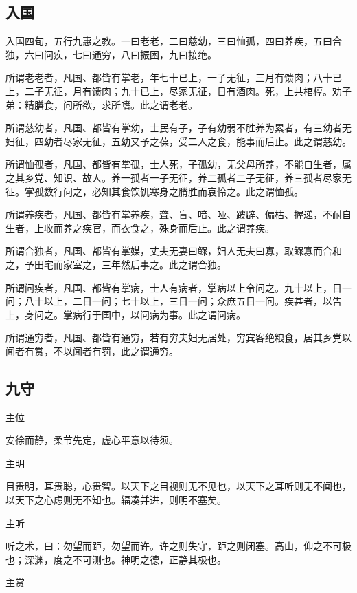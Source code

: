 \documentclass[]{article}
\begin{document}
\hypertarget{header-n700}{%
\subsection{入国}\label{header-n700}}

入国四旬，五行九惠之教。一曰老老，二曰慈幼，三曰恤孤，四曰养疾，五曰合独，六曰问疾，七曰通穷，八曰振困，九曰接绝。

所谓老老者，凡国、都皆有掌老，年七十已上，一子无征，三月有馈肉；八十已上，二子无征，月有馈肉；九十已上，尽家无征，日有酒肉。死，上共棺椁。劝子弟：精膳食，问所欲，求所嗜。此之谓老老。

所谓慈幼者，凡国、都皆有掌幼，士民有子，子有幼弱不胜养为累者，有三幼者无妇征，四幼者尽家无征，五幼又予之葆，受二人之食，能事而后止。此之谓慈幼。

所谓恤孤者，凡国、都皆有掌孤，士人死，子孤幼，无父母所养，不能自生者，属之其乡党、知识、故人。养一孤者一子无征，养二孤者二子无征，养三孤者尽家无征。掌孤数行问之，必知其食饮饥寒身之膌胜而哀怜之。此之谓恤孤。

所谓养疾者，凡国、都皆有掌养疾，聋、盲、喑、哑、跛辟、偏枯、握递，不耐自生者，上收而养之疾官，而衣食之，殊身而后止。此之谓养疾。

所谓合独者，凡国、都皆有掌媒，丈夫无妻曰鳏，妇人无夫曰寡，取鳏寡而合和之，予田宅而家室之，三年然后事之。此之谓合独。

所谓问疾者，凡国、都皆有掌病，士人有病者，掌病以上令问之。九十以上，日一问；八十以上，二日一问；七十以上，三日一问；众庶五日一问。疾甚者，以告上，身问之。掌病行于国中，以问病为事。此之谓问病。

所谓通穷者，凡国、都皆有通穷，若有穷夫妇无居处，穷宾客绝粮食，居其乡党以闻者有赏，不以闻者有罚，此之谓通穷。

\hypertarget{header-n711}{%
\subsection{九守}\label{header-n711}}

主位

安徐而静，柔节先定，虚心平意以待须。

主明

目贵明，耳贵聪，心贵智。以天下之目视则无不见也，以天下之耳听则无不闻也，以天下之心虑则无不知也。辐凑并进，则明不塞矣。

主听

听之术，曰：勿望而距，勿望而许。许之则失守，距之则闭塞。高山，仰之不可极也；深渊，度之不可测也。神明之德，正静其极也。

主赏
\end{document}
